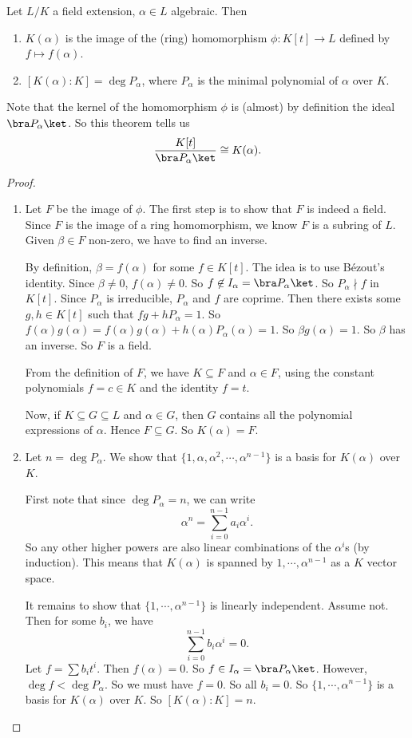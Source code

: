 \documentclass[a4paper]{article}
\begin{document}
\begin{thm}
  Let $L/K$ a field extension, $\alpha\in L$ algebraic. Then
  \begin{enumerate}
    \item $K(\alpha)$ is the image of the (ring) homomorphism $\phi: K[t] \to L$ defined by $f \mapsto f(\alpha)$.
    \item $[K(\alpha): K] = \deg P_\alpha$, where $P_\alpha$ is the minimal polynomial of $\alpha$ over $K$.
  \end{enumerate}
\end{thm}
Note that the kernel of the homomorphism $\phi$ is (almost) by definition the ideal $\bra P_\alpha\ket$. So this theorem tells us
\[
  \frac{K[t]}{\bra P_\alpha\ket}\cong K(\alpha).
\]
\begin{proof}\leavevmode
  \begin{enumerate}
    \item Let $F$ be the image of $\phi$. The first step is to show that $F$ is indeed a field. Since $F$ is the image of a ring homomorphism, we know $F$ is a subring of $L$. Given $\beta \in F$ non-zero, we have to find an inverse.

      By definition, $\beta = f(\alpha)$ for some $f\in K[t]$. The idea is to use B\'ezout's identity. Since $\beta \not= 0$, $f(\alpha) \not= 0$. So $f \not \in I_\alpha = \bra P_\alpha\ket$. So $P_\alpha \nmid f$ in $K[t]$. Since $P_\alpha$ is irreducible, $P_\alpha$ and $f$ are coprime. Then there exists some $g, h \in K[t]$ such that $fg + hP_\alpha = 1$. So $f(\alpha)g(\alpha) = f(\alpha) g(\alpha) + h(\alpha)P_\alpha(\alpha) = 1$. So $\beta g(\alpha) = 1$. So $\beta$ has an inverse. So $F$ is a field.

      From the definition of $F$, we have $K \subseteq F$ and $\alpha \in F$, using the constant polynomials $f = c \in K$ and the identity $f = t$.

      Now, if $K\subseteq G\subseteq L$ and $\alpha \in G$, then $G$ contains all the polynomial expressions of $\alpha$. Hence $F\subseteq G$. So $K(\alpha) = F$.
    \item Let $n = \deg P_\alpha$. We show that $\{1, \alpha, \alpha^2, \cdots, \alpha^{n - 1}\}$ is a basis for $K(\alpha)$ over $K$.

      First note that since $\deg P_\alpha = n$, we can write
      \[
        \alpha^n = \sum_{i = 0}^{n - 1} a_i \alpha^i.
      \]
      So any other higher powers are also linear combinations of the $\alpha^i$s (by induction). This means that $K(\alpha)$ is spanned by $1, \cdots, \alpha^{n - 1}$ as a $K$ vector space.

      It remains to show that $\{1, \cdots, \alpha^{n - 1}\}$ is linearly independent. Assume not. Then for some $b_i$, we have
      \[
        \sum_{i = 0}^{n - 1} b_i \alpha^i = 0.
      \]
      Let $f = \sum b_i t^i$. Then $f(\alpha) = 0$. So $f \in I_\alpha = \bra P_\alpha\ket$. However, $\deg f < \deg P_\alpha$. So we must have $f = 0$. So all $b_i = 0$. So $\{1, \cdots, \alpha^{n - 1}\}$ is a basis for $K(\alpha)$ over $K$. So $[K(\alpha): K] = n$.
  \end{enumerate}
\end{proof}
\end{document}
